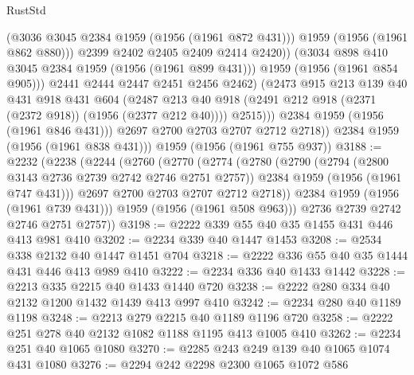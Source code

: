 \begin{lexlean}{RustStd}
\begin{coremodule}
                          (@3036 @3045 @2384 @1959 (@1956 (@1961 @872 @431)))
                          @1959
                          (@1956 (@1961 @862 @880)))
                        @2399
                        @2402
                        @2405
                        @2409
                        @2414
                        @2420))
                    (@3034 @898 @410 @3045 @2384 @1959 (@1956 (@1961 @899 @431)))
                    @1959
                    (@1956 (@1961 @854 @905)))
                  @2441
                  @2444
                  @2447
                  @2451
                  @2456
                  @2462)
                (@2473
                  @915
                  @213
                  @139
                  @40
                  @431
                  @918
                  @431
                  @604
                  (@2487
                    @213
                    @40
                    @918
                    (@2491 @212 @918 (@2371 (@2372 @918)) (@1956 (@2377 @212 @40))))
                  @2515)))
            @2384
            @1959
            (@1956 (@1961 @846 @431)))
          @2697
          @2700
          @2703
          @2707
          @2712
          @2718))
      @2384
      @1959
      (@1956 (@1961 @838 @431)))
    @1959
    (@1956 (@1961 @755 @937))
@3188 := @2232
    (@2238
      (@2244
        (@2760
          (@2770
            (@2774
              (@2780
                (@2790
                  (@2794 (@2800 @3143 @2736 @2739 @2742 @2746 @2751 @2757))
                  @2384
                  @1959
                  (@1956 (@1961 @747 @431)))
                @2697
                @2700
                @2703
                @2707
                @2712
                @2718))
            @2384
            @1959
            (@1956 (@1961 @739 @431)))
          @1959
          (@1956 (@1961 @508 @963)))
        @2736
        @2739
        @2742
        @2746
        @2751
        @2757))
@3198 := @2222 @339 @55 @40 @35 @1455 @431 @446 @413 @981 @410
@3202 := @2234 @339 @40 @1447 @1453
@3208 := @2534 @338 @2132 @40 @1447 @1451 @704
@3218 := @2222 @336 @55 @40 @35 @1444 @431 @446 @413 @989 @410
@3222 := @2234 @336 @40 @1433 @1442
@3228 := @2213 @335 @2215 @40 @1433 @1440 @720
@3238 := @2222 @280 @334 @40 @2132 @1200 @1432 @1439 @413 @997 @410
@3242 := @2234 @280 @40 @1189 @1198
@3248 := @2213 @279 @2215 @40 @1189 @1196 @720
@3258 := @2222 @251 @278 @40 @2132 @1082 @1188 @1195 @413 @1005 @410
@3262 := @2234 @251 @40 @1065 @1080
@3270 := @2285 @243 @249 @139 @40 @1065 @1074 @431 @1080
@3276 := @2294 @242 @2298 @2300 @1065 @1072 @586

\end{coremodule}
\end{lexlean}
